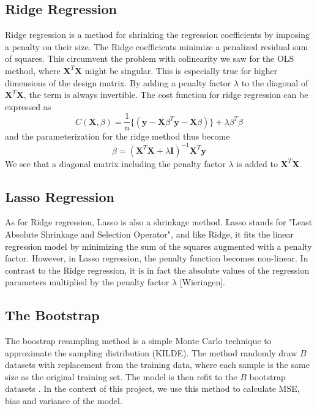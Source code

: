 \documentclass{article}
\begin{document}
\subsection{Ridge Regression}
Ridge regression is a method for shrinking the regression coefficients by imposing a penalty on their size. The Ridge coefficients minimize a penalized residual sum of squares. This circumvent the problem with colinearity we saw for the OLS method, where $\textbf{X}^{T}\textbf{X}$ might be singular. This is especially true for higher dimensions of the design matrix. By adding a penalty factor $\lambda$ to the diagonal of $\textbf{X}^{T}\textbf{X}$, the term is always invertible. The cost function for ridge regression can be expressed as
\begin{equation}
C(\textbf{X},\beta) = \dfrac{1}{n} \{( \textbf{y}-\textbf{X}\beta^{T}\textbf{y}-\textbf{X}\beta)\} + \lambda \beta^{T} \beta 
\end{equation}
and the parameterization for the ridge method thus become
\begin{equation}
\beta = (\textbf{X}^{T}\textbf{X} + \lambda\textbf{I})^{-1}\textbf{X}^{T}\textbf{y}
\end{equation}
We see that a diagonal matrix including the penalty factor $\lambda$ is added to $\textbf{X}^{T}\textbf{X}$. 
\subsection{Lasso Regression}
As for Ridge regression, Lasso is also a shrinkage method. Lasso stands for "Least Absolute Shrinkage and Selection Operator", and like Ridge, it fits the linear regression model by minimizing the sum of the squares augmented with a penalty factor. However, in Lasso regression, the penalty function becomes non-linear. In contrast to the Ridge regression, it is in fact the absolute values of the regression parameters multiplied by the penalty factor $\lambda$ [Wieringen].
\subsection{The Bootstrap}
The boostrap resampling method is a simple Monte Carlo technique to approximate the sampling distribution (KILDE). The method randomly draw $B$ datasets with replacement from the training data, where each sample is the same size as the original training set. The model is then refit to the $B$ bootstrap datasets \cite{1}. In the context of this project, we use this method to calculate MSE, bias and variance of the model.
\end{document}
